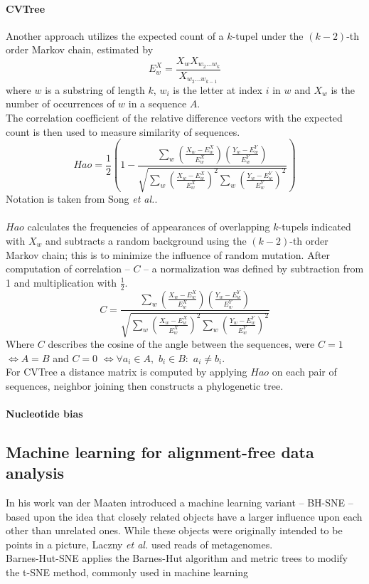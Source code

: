 \documentclass[twocolumn]{bmcart}%
\begin{document}
\paragraph*{CVTree}
Another approach utilizes the expected count of a $k$-tupel under the $(k-2)$-th order Markov chain, estimated by 
$$E_w^X=\frac{X_wX_{w_2\dots w_k}}{X_{w_2\dots w_{k-1}}}$$
where $w$ is a substring of length $k$, $w_i$ is the letter at index $i$ in $w$ and $X_w$ is the number of occurrences of $w$ in a sequence $A$.\\
The correlation coefficient of the relative difference vectors with the expected count is then used to measure similarity of sequences.
$$Hao=\frac{1}{2}\left(1-\frac{\sum_w\left(\frac{X_w-E_w^X}{E_w^X}\right)\left(\frac{Y_w-E_w^Y}{E_w^Y}\right)}{\sqrt{\sum_w\left(\frac{X_w-E_w^X}{E_w^X}\right)^2\sum_w\left(\frac{Y_w-E_w^Y}{E_w^Y}\right)^2}}\right)$$
Notation is taken from Song \textit{et al.}\cite{doi:10.1093/bib/bbt067}.\\
\\
$Hao$ calculates the frequencies of appearances of overlapping $k$-tupels indicated with $X_w$ and subtracts a random background using the $(k-2)$-th order Markov chain; this is to minimize the influence of random mutation. After computation of correlation -- $C$ -- a normalization was defined by subtraction from 1 and multiplication with $\frac{1}{2} $.
$$C=\frac{\sum_w\left(\frac{X_w-E_w^X}{E_w^X}\right)\left(\frac{Y_w-E_w^Y}{E_w^Y}\right)}{\sqrt{\sum_w\left(\frac{X_w-E_w^X}{E_w^X}\right)^2\sum_w\left(\frac{Y_w-E_w^Y}{E_w^Y}\right)^2}}$$
Where $C$ describes the cosine of the angle between the sequences, were $C=1$ $\Leftrightarrow A=B$ and $C=0$ $\Leftrightarrow \forall a_i \in A,$ $b_i \in B:$ $a_i \neq b_i$. \\
For CVTree a distance matrix is computed by applying $Hao$ on each pair of sequences, neighbor joining then constructs a phylogenetic tree\cite{qi2004cvtree}. 
\paragraph*{Nucleotide bias}
\subsection*{Machine learning for alignment-free data analysis}
In his work van der Maaten\cite{DBLP:journals/corr/abs-1301-3342} introduced a machine learning variant -- BH-SNE --  based upon the idea that closely related objects have a larger influence upon each other than unrelated ones. While these objects were originally intended to be points in a picture, Laczny \textit{et al.}\cite{Laczny2014} used reads of metagenomes.\\
Barnes-Hut-SNE applies the Barnes-Hut algorithm and metric trees to modify the t-SNE method, commonly used in machine learning
\end{document}

